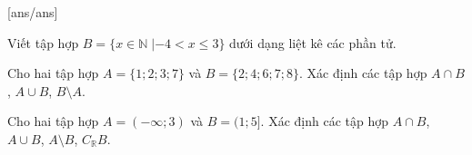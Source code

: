 [ans/ans]

\begin{bt}[0.5 điểm]%
Viết tập hợp $B= \lbrace x \in \mathbb{N} \; | -4 <x \le 3 \rbrace$ dưới dạng liệt kê các phần tử.
\end{bt}

\begin{bt}[1.5 điểm]%
Cho hai tập hợp $A=\lbrace 1;2;3;7 \rbrace$ và $B=\lbrace 2;4;6;7;8 \rbrace$. Xác định các tập hợp $A \cap B$, $A \cup B$, $B \setminus A$.
\end{bt}

\begin{bt}[2.0 điểm]%
Cho hai tập hợp $A=(-\infty ;3)$ và $B=(1;5]$. Xác định các tập hợp $A \cap B$, $A \cup B$, $A \setminus B$, $C_\mathbb{R}B.$
\loigiai{\begin{itemize}
\item $A \cap B =(1,3).$
\item $A \cup B = (-\infty;5]$.
\item $A \setminus B = (-\infty;1]$.
\item $C_\mathbb{R}B = (-\infty;1] \cup (5;+\infty)$.
\end{itemize}
}
\end{bt}

